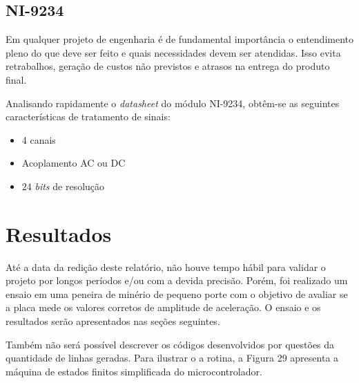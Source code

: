 \documentclass[
	12pt,				%
	openright,			%
	twoside,			%
	a4paper,			%
	english,			%
	french,				%
	spanish,			%
	brazil,				%
	]{abntex2}
\begin{document}
	\section{NI-9234}
		Em qualquer projeto de engenharia é de fundamental importância o
		entendimento pleno do que deve ser feito e quais necessidades devem ser
		atendidas. Isso evita retrabalhos, geração de custos não previstos e atrasos
		na entrega do produto final.

		Analisando rapidamente o \textit{datasheet} do módulo NI-9234, obtêm-se as seguintes
		características de tratamento de sinais:

		\begin{itemize}
			\item 4 canais
			\item Acoplamento AC ou DC
			\item $24$ \textit{bits} de resolução
		\end{itemize}

\chapter{Resultados}
	Até a data da redição deste relatório, não houve tempo hábil para
	validar o projeto por longos períodos e/ou com a devida precisão.
	Porém, foi realizado um ensaio em uma peneira de minério de pequeno
	porte com o objetivo de avaliar se a placa mede os valores corretos
	de amplitude de aceleração. O ensaio e os resultados serão
	apresentados nas seções seguintes.

	Também não será possível descrever os códigos desenvolvidos por
	questões da quantidade de linhas geradas. Para ilustrar o a rotina,
	a Figura 29 apresenta a máquina de estados finitos simplificada do
	microcontrolador.
\end{document}
